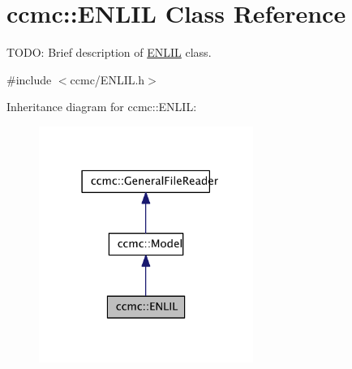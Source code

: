 \hypertarget{classccmc_1_1_e_n_l_i_l}{\section{ccmc\-:\-:E\-N\-L\-I\-L Class Reference}
\label{classccmc_1_1_e_n_l_i_l}
}


T\-O\-D\-O\-: Brief description of \hyperlink{classccmc_1_1_e_n_l_i_l}{E\-N\-L\-I\-L} class.  




{\ttfamily \#include $<$ccmc/\-E\-N\-L\-I\-L.\-h$>$}



Inheritance diagram for ccmc\-:\-:E\-N\-L\-I\-L\-:\nopagebreak
\begin{figure}[H]
\begin{center}
\leavevmode
\includegraphics[width=198pt]{classccmc_1_1_e_n_l_i_l__inherit__graph}
\end{center}
\end{figure}


